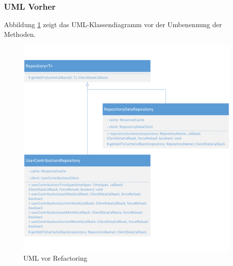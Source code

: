 \documentclass[12pt]{article}
\begin{document}
\subsubsection{UML Vorher}
Abbildung \ref{fig:RenameMethod_Refactoring_Before} zeigt das UML-Klassendiagramm vor der Umbenennung der Methoden.
\begin{figure}[h]
  \includegraphics{refactoring_rename_method_repository_before.png}
  \centering
  \caption{UML vor Refactoring}
  \label{fig:RenameMethod_Refactoring_Before}
\end{figure}

\newpage
\end{document}

